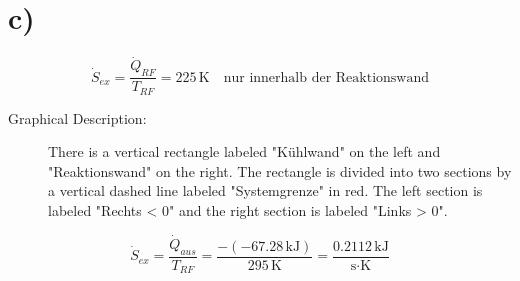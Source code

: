 

\section*{c)}
\[
\dot{S}_{ex} = \frac{\dot{Q}_{RF}}{T_{RF}} = 225 \, \text{K} \quad \text{nur innerhalb der Reaktionswand}
\]

\begin{description}
    \item[Graphical Description:] 
    There is a vertical rectangle labeled "Kühlwand" on the left and "Reaktionswand" on the right. The rectangle is divided into two sections by a vertical dashed line labeled "Systemgrenze" in red. The left section is labeled "Rechts < 0" and the right section is labeled "Links > 0".
\end{description}

\[
\dot{S}_{ex} = \frac{\dot{Q}_{aus}}{T_{RF}} = \frac{-(-67.28 \, \text{kJ})}{295 \, \text{K}} = \frac{0.2112 \, \text{kJ}}{\text{s} \cdot \text{K}}
\]